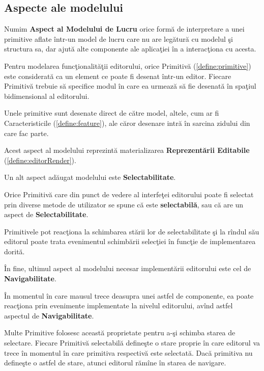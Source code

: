 \subsection{Aspecte ale modelului}

\begin{definition}
\label{define:model-aspect}
Numim \textbf{Aspect al Modelului de Lucru} orice formă de interpretare a unei 
primitive aflate într-un model de lucru care nu are legătură cu modelul şi 
structura sa, dar ajută alte componente ale aplicaţiei în a interacţiona cu 
acesta.
\end{definition}

Pentru modelarea funcţionalităţii editorului, orice Primitivă 
(\ref{define:primitive}) este considerată ca un element ce poate fi desenat 
într-un editor. Fiecare Primitivă trebuie să specifice modul în care ea urmează 
să fie desenată în spaţiul bidimensional al editorului.

Unele primitive sunt desenate direct de către model, altele, cum ar fi 
Caracteristicile (\ref{define:feature}), ale căror desenare intră în 
sarcina zidului din care fac parte.

Acest aspect al modelului reprezintă materializarea \textbf{Reprezentării 
Editabile} (\ref{define:editorRender}).

Un alt aspect adăugat modelului este \textbf{Selectabilitate}.

\begin{definition}
\label{define:selectable}
Orice Primitivă care din punct de vedere al interfeţei editorului poate fi 
selectat prin diverse metode de utilizator se spune că este 
\textbf{selectabilă}, sau că are un aspect de \textbf{Selectabilitate}.
\end{definition}

Primitivele pot reacţiona la schimbarea stării lor de selectabilitate şi la 
rîndul său editorul poate trata evenimentul schimbării selecţiei în funcţie de 
implementarea dorită.

În fine, ultimul aspect al modelului necesar implementării editorului este cel 
de \textbf{Navigabilitate}.

\begin{definition}
\label{define:hoverable}
În momentul în care mausul trece deasupra unei 
astfel de componente, ea poate reacţiona prin evenimente implementate la 
nivelul editorului, avînd astfel aspectul de \textbf{Navigabilitate}.
\end{definition}

Multe Primitive folosesc această proprietate pentru a-şi schimba starea de 
selectare. Fiecare Primitivă selectabilă defineşte o stare proprie în care
editorul va trece în momentul în care primitiva respectivă este selectată. Dacă
primitiva nu defineşte o astfel de stare, atunci editorul rămîne în starea de
navigare.

